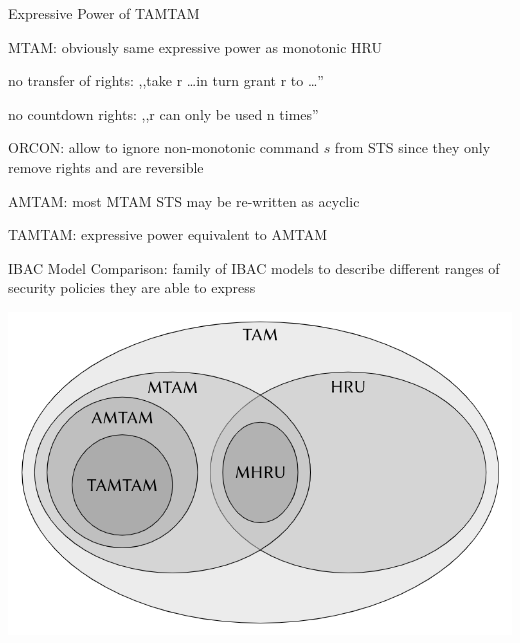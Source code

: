 \documentclass[a4paper]{article}
\begin{document}
\begin{multicols}{3}
    Expressive Power of TAMTAM
    \begin{itemize*}
        \item MTAM: obviously same expressive power as monotonic HRU
        \begin{itemize*}
            \item no transfer of rights: ,,take r \dots  in turn grant r to \dots ''
            \item no countdown rights: ,,r can only be used n times''
        \end{itemize*}
        \item ORCON: allow to ignore non-monotonic command $s$ from STS since they only remove rights and are reversible
        \item AMTAM: most MTAM STS may be re-written as acyclic
        \item TAMTAM: expressive power equivalent to AMTAM
    \end{itemize*}

    \begin{multicols}{2}
        IBAC Model Comparison: family of IBAC models to describe different ranges of security policies they are able to express \columnbreak

        \includegraphics[width=.5\linewidth]{Assets/Systemsicherheit-ibac-model-comparison.png}
    \end{multicols}


\end{multicols}
\end{document}
